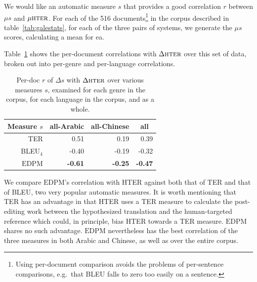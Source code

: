 \documentclass[11pt]{article}
\newcommand{\myEDPM}[0]{\ensuremath{\mathrm{EDPM}}}
\begin{document}
We would like an automatic measure $s$ that provides a good
correlation $r$ between $\mu s$ and $\mu \textsc{hter}$.  For
each of the 516 documents\footnote{Using per-document comparison
  avoids the problems of per-sentence comparisons, e.g.\ that BLEU
  falls to zero too easily on a sentence.} in the corpus described in
table~\ref{tab:galestats}, for each of the three pairs of systems, we
generate the $\mu s$ scores, calculating a mean for ea.


Table~\ref{tab:hter:perdoc1} shows the per-document correlations with
$\Delta\textsc{hter}$ over this set of data, broken out into per-genre
and per-language correlations.

\begin{table}
  \centering
  \begin{tabular}{r|r|r||r}
     \multicolumn{1}{c|}{Measure $s$} 
     & \multicolumn{1}{c|}{all-Arabic} &
     \multicolumn{1}{c||}{all-Chinese} &\multicolumn{1}{c}{all}\\
    \hline{}
    TER      &  0.51 &  0.19 &  0.39 \\
    BLEU$_4$ & -0.40 & -0.19 & -0.32 \\
    \myEDPM  & 
       \textbf{-0.61}&
               \textbf{-0.25}&
                       \textbf{-0.47}\\
  \end{tabular}
  \caption{Per-doc $r$ of $\Delta s$ with $\Delta\textsc{hter}$ over
    various measures $s$, examined for each genre in the corpus, for each
    language in the corpus, and as a whole. }
  \label{tab:hter:perdoc1}
\end{table}
We compare \myEDPM{}'s correlation with HTER against both that of TER
and that of BLEU, two very popular automatic measures. It is worth
mentioning that TER has an 
advantage in that HTER uses a TER
measure to calculate the post-editing work between the hypothesized
translation and the human-targeted reference which could, in
principle, bias HTER towards a TER measure. \myEDPM{} shares no such
advantage.  \myEDPM{} nevertheless has the best
correlation of the three measures in both Arabic and
Chinese, as well as over the entire corpus.
\end{document}
